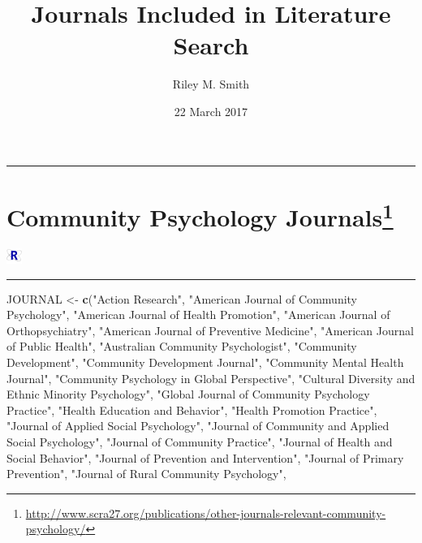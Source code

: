 \documentclass[]{tufte-handout}
\title{Journals Included in Literature Search}
\author{Riley M. Smith}
\date{22 March 2017}
\newenvironment{Shaded}{}{}
\newcommand{\KeywordTok}[1]{\textbf{{#1}}}
\newcommand{\StringTok}[1]{{#1}}
\newcommand{\NormalTok}[1]{{#1}}
\newcommand{\Rrule}{
    \vspace*{1em}
    \noindent
    \hspace{-1em}
    \includegraphics[width=0.5cm]{auxDocs/Rlogo.png}
    \textcolor{Rblue}{
        \rule[0.1in]{0.90\linewidth}{0.02mm}
    }
    \vspace{-1.35em}
}
\newcommand{\Frule}{
    \vspace*{-1em}
    \begin{fullwidth}\textcolor{blublk}{\rule{\linewidth}{0.2mm}}\end{fullwidth}
}
\begin{document}
\maketitle




\Frule

\section[Community Psychology Journals]{\texorpdfstring{Community
Psychology Journals\footnote{\url{http://www.scra27.org/publications/other-journals-relevant-community-psychology/}}}{Community Psychology Journals}}\label{community-psychology-journals}

\Rrule

\begin{Shaded}
\begin{Highlighting}[]
\NormalTok{JOURNAL <-}\StringTok{ }\KeywordTok{c}\NormalTok{(}\StringTok{"Action Research"}\NormalTok{,}
             \StringTok{"American Journal of Community Psychology"}\NormalTok{,}
             \StringTok{"American Journal of Health Promotion"}\NormalTok{,}
             \StringTok{"American Journal of Orthopsychiatry"}\NormalTok{,}
             \StringTok{"American Journal of Preventive Medicine"}\NormalTok{,}
             \StringTok{"American Journal of Public Health"}\NormalTok{,}
             \StringTok{"Australian Community Psychologist"}\NormalTok{,}
             \StringTok{"Community Development"}\NormalTok{,}
             \StringTok{"Community Development Journal"}\NormalTok{,}
             \StringTok{"Community Mental Health Journal"}\NormalTok{,}
             \StringTok{"Community Psychology in Global Perspective"}\NormalTok{,}
             \StringTok{"Cultural Diversity and Ethnic Minority Psychology"}\NormalTok{,}
             \StringTok{"Global Journal of Community Psychology Practice"}\NormalTok{,}
             \StringTok{"Health Education and Behavior"}\NormalTok{,}
             \StringTok{"Health Promotion Practice"}\NormalTok{,}
             \StringTok{"Journal of Applied Social Psychology"}\NormalTok{,}
             \StringTok{"Journal of Community and Applied Social Psychology"}\NormalTok{,}
             \StringTok{"Journal of Community Practice"}\NormalTok{,}
             \StringTok{"Journal of Health and Social Behavior"}\NormalTok{,}
             \StringTok{"Journal of Prevention and Intervention"}\NormalTok{,}
             \StringTok{"Journal of Primary Prevention"}\NormalTok{,}
             \StringTok{"Journal of Rural Community Psychology"}\NormalTok{,}

\end{Highlighting}
\end{Shaded}
\end{document}
